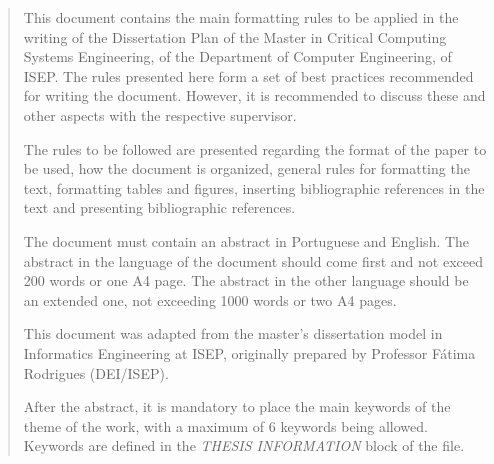 

\frontmatter %

\pagestyle{plain} %


\maketitlepage



\integritystatement



\begin{abstract}


  This document contains the main formatting rules to be applied in the writing of the Dissertation Plan of the Master in Critical Computing Systems Engineering, of the Department of Computer Engineering, of ISEP. The rules presented here form a set of best practices recommended for writing the document. However, it is recommended to discuss these and other aspects with the respective supervisor.

  The rules to be followed are presented regarding the format of the paper to be used, how the document is organized, general rules for formatting the text, formatting tables and figures, inserting bibliographic references in the text and presenting bibliographic references.

  The document must contain an abstract in Portuguese and English. The abstract in the  language of the document should come first and not exceed 200 words or one A4 page. The abstract in the other language should be an extended one, not exceeding 1000 words or two A4 pages.

  This document was adapted from the master's dissertation model in Informatics Engineering at ISEP, originally prepared by Professor Fátima Rodrigues (DEI/ISEP).

  After the abstract, it is mandatory to place the main keywords of the theme of the work, with a maximum of 6 keywords being allowed. Keywords are defined in the \emph{THESIS INFORMATION} block of the  file.

\end{abstract}


